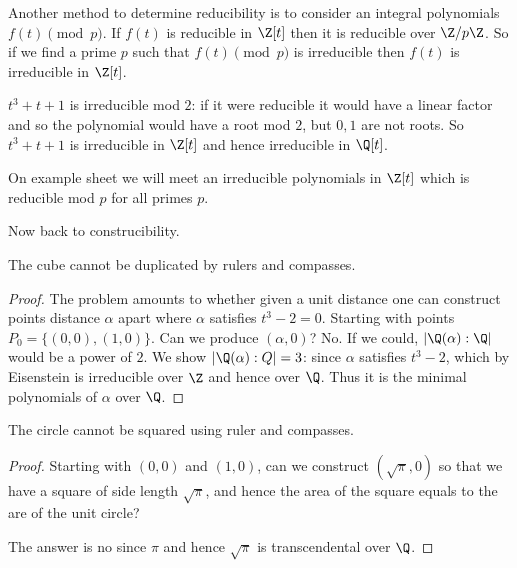 \documentclass[a4paper]{article}
\begin{document}
Another method to determine reducibility is to consider an integral polynomials \(f(t) \pmod p\). If \(f(t)\) is reducible in \(\Z[t]\) then it is reducible over \(\Z/p\Z\). So if we find a prime \(p\) such that \(f(t) \pmod p\) is irreducible then \(f(t)\) is irreducible in \(\Z[t]\).

\begin{eg}
  \(t^3 + t + 1\) is irreducible mod \(2\): if it were reducible it would have a linear factor and so the polynomial would have a root mod \(2\), but \(0, 1\) are not roots. So \(t^3 + t + 1\) is irreducible in \(\Z[t]\) and hence irreducible in \(\Q[t]\).
\end{eg}

\begin{remark}
  On example sheet we will meet an irreducible polynomials in \(\Z[t]\) which is reducible mod \(p\) for all primes \(p\).
\end{remark}

Now back to construcibility.

\begin{theorem}
  The cube cannot be duplicated by rulers and compasses.
\end{theorem}

\begin{proof}
  The problem amounts to whether given a unit distance one can construct points distance \(\alpha\) apart where \(\alpha\) satisfies \(t^3 - 2 = 0\). Starting with points \(P_0 = \{(0, 0), (1, 0)\}\). Can we produce \((\alpha, 0)\)? No. If we could, \(|\Q(\alpha): \Q|\) would be a power of \(2\). We show \(|\Q(\alpha) : Q| = 3\): since \(\alpha\) satisfies \(t^3 - 2\), which by Eisenstein is irreducible over \(\Z\) and hence over \(\Q\). Thus it is the minimal polynomials of \(\alpha\) over \(\Q\).
\end{proof}

\begin{theorem}
  The circle cannot be squared using ruler and compasses.
\end{theorem}

\begin{proof}
  Starting with \((0, 0)\) and \((1, 0)\), can we construct \((\sqrt \pi, 0)\) so that we have a square of side length \(\sqrt \pi\), and hence the area of the square equals to the are of the unit circle?

  The answer is no since \(\pi\) and hence \(\sqrt \pi\) is transcendental over \(\Q\).
\end{proof}
\end{document}
